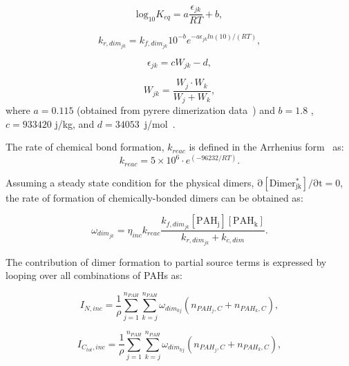 \begin{equation}
	\mathrm{log}_{10}K_{eq}=
	a\frac{\epsilon_{jk}}{RT}+b
	\label{eqn:keq_reacdim},
\end{equation}

\begin{equation}
	k_{r,dim_{jk}} = k_{f,dim_{jk}}10^{-b}e^{-a\epsilon_{jk} ln(10)/(RT)}
	\label{eqn:krphydim_reacdim},
\end{equation}

\begin{equation}
	\epsilon_{jk} = cW_{jk} -d
	\label{eqn:epsilon_reacdim},
\end{equation}

\begin{equation}
	W_{jk} = \frac{W_j\cdot W_k}{W_j+W_k}
	\label{eqn:Wjk_reacdim},
\end{equation}
   \noindent where ${a=0.115}$ (obtained from pyrere dimerization data~\cite{sabbah2010exploring}) and $b=1.8$ \cite{kholghy2018reactive}, $c=933420$ j/kg, and $d=34053$~j/mol~\citep{kholghy2018reactive}. 

The rate of chemical bond formation, ${k_{reac}}$ is defined in the Arrhenius form~\cite{naseri2022simulating} as:
\begin{equation}
	k_{reac} = 5\times10^6\cdot e^{(-96232/RT)}
	\label{eqn:kc_reacdim}.
\end{equation}

Assuming a steady state condition for the physical dimers, $\mathrm{\partial [Dimer^*_{jk}]/\partial t=0}$, the rate of formation of chemically-bonded dimers can be obtained as:

\begin{equation}
	\omega_{dim_{jk}} = \eta_{inc} k_{reac}\frac{k_{f,dim_{jk}}[\mathrm{PAH_j}][\mathrm{PAH_k}]}
	{k_{r,dim_{jk}}+k_{c,dim}}
	\label{eqn:chemdimer_reacdim}.
\end{equation}

The contribution of dimer formation to partial source terms is expressed by looping over all combinations of PAHs as:

\begin{equation}
	I_{N,{inc}} = 
	\frac{1}{\rho}
	\sum_{j=1}^{n_{PAH}} \sum_{k=j}^{n_{PAH}}  \omega_{dim_{kj}} 
	\left(
	n_{PAH_j,C}+n_{PAH_k,C}
	\right)
	\label{eqn:IN_inc},
\end{equation}

\begin{equation}
	I_{C_{tot},{inc}} = 
	\frac{1}{\rho}
	\sum_{j=1}^{n_{PAH}} \sum_{k=j}^{n_{PAH}}  \omega_{dim_{kj}} 
	\left(
	n_{PAH_j,C}+n_{PAH_k,C}
	\right)
	\label{eqn:ICtot_inc},
\end{equation}

